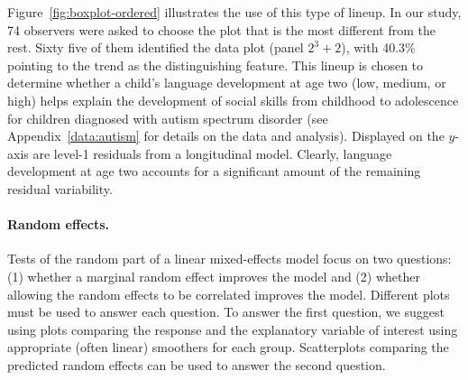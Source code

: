 \documentclass[12pt]{article} %
\begin{document}
Figure~\ref{fig:boxplot-ordered} illustrates the use of this type of lineup. In our study, 74 observers were asked to choose the plot that is the most different from the rest. Sixty five of them identified the data plot (panel $2^3 + 2$), 
with 40.3\% pointing to the trend as the distinguishing feature. 
This lineup is chosen
to determine whether a child's language development at age two (low, medium, or high) helps explain the development of social skills from childhood to adolescence for children diagnosed with autism spectrum disorder (see Appendix~\ref{data:autism} for details on the data and analysis). Displayed on the $y$-axis are level-1 residuals from a longitudinal model. Clearly, language development at age two accounts for a significant amount of the remaining residual variability.




\paragraph{Random effects.} Tests of the random part of a linear mixed-effects model focus on two questions: (1) whether a marginal random effect improves the model and (2) whether allowing the random effects to be correlated improves the model. Different plots must be used to answer each question. To answer the first question, we suggest using plots comparing the response and the explanatory variable of interest using appropriate (often linear) smoothers for each group. Scatterplots comparing the predicted random effects can be used to answer the second question.
\end{document}

